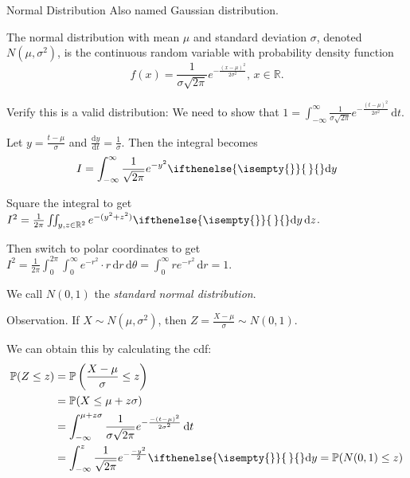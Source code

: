 \documentclass[a4paper,11pt]{amsbook}
\makeatletter
\def\section{\@startsection{section}{2}%
    \z@{1\linespacing\@plus1\linespacing}{.5\linespacing}%
    {\large\normalfont\bfseries\centering\color{darkblue}}}
\theoremstyle{definition}
\theoremstyle{remark}
\newcommand{\R}{\mathbb{R}}
\renewcommand{\P}{\mathbb{P}}
\newcommand\0{\varnothing}
\newcommand\dy[1][]{\ifthenelse{\isempty{#1}}{\,}{}\mathrm{d}y}
\newcommand\dt[1][t]{\,\mathrm{d}#1}
\newcommand\diff[2][]
{
    \frac{\mathrm{d}#1}{\mathrm{d}#2}
}
\makeatother
\begin{document}
    \section{Normal Distribution}
    Also named Gaussian distribution.

    The normal distribution with mean $\mu$ and standard deviation $\sigma$, denoted $N(\mu,\sigma^2)$,
    is the continuous random variable with probability density function
    $$f(x)=\frac{1}{\sigma\sqrt{2\pi}}e^{-\frac{(x-\mu)^2}{2\sigma^2}},\,x\in\R.$$ 
    \begin{center}
    \end{center}

    Verify this is a valid distribution: We need to show that $1=\int_{-\infty}^{\infty}\frac{1}{\sigma\sqrt{2\pi}}e^{-\frac{(t-\mu)^2}{2\sigma^2}}\dt$.

    Let $y=\frac{t-\mu}{\sigma}$ and $\diff[y]{t}=\frac{1}{\sigma}$. Then the integral becomes 
    \begin{align*}
        I=\int_{-\infty}^{\infty}\frac{1}{\sqrt{2\pi}}e^{-y^2}\dy
    \end{align*}

    Square the integral to get $I^2=\frac{1}{2\pi}\iint_{y,z\in\R^2}e^{-(y^2+z^2)}\dy\dt[z]$.

    Then switch to polar coordinates to get $I^2=\frac{1}{2\pi}\int_0^{2\pi}\int_0^\infty e^{-r^2}\cdot r\dt[r]\dt[\theta]=\int_0^\infty re^{-r^2}\dt[r]=1$.

    We call $N(0,1)$ the \emph{standard normal distribution}.
    
    Observation. If $X\sim N(\mu,\sigma^2)$, then $Z=\frac{X-\mu}{\sigma}\sim N(0,1)$.
    
    We can obtain this by calculating the cdf: \begin{align*}
        \P(Z\leq z)&=\P\left(\frac{X-\mu}{\sigma}\leq z\right) \\
        &=\P(X\leq\mu+z\sigma) \\
        &=\int_{-\infty}^{\mu+z\sigma}\frac{1}{\sigma\sqrt{2\pi}}e^{-\frac{-(t-\mu)^2}{2\sigma^2}}\dt \\
        &=\int_{-\infty}^{z}\frac{1}{\sqrt{2\pi}}e^{-\frac{-y^2}{2}}\dy=\P(N(0,1)\leq z)
    \end{align*}
\end{document}
